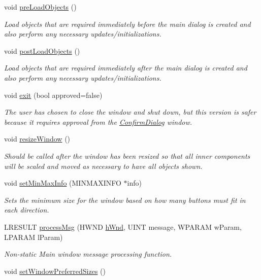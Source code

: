 \begin{DoxyCompactItemize}
void \hyperlink{class_three_d_viewer_a15047086e77ebf717c3dae973ae88d53}{preLoadObjects} ()
\begin{DoxyCompactList}\small\item\em Load objects that are required immediately before the main dialog is created and also perform any necessary updates/initializations. \end{DoxyCompactList}\item 
void \hyperlink{class_three_d_viewer_a6c8ae9a10fc6d77c57a538aad76dfdef}{postLoadObjects} ()
\begin{DoxyCompactList}\small\item\em Load objects that are required immediately after the main dialog is created and also perform any necessary updates/initializations. \end{DoxyCompactList}\item 
void \hyperlink{class_three_d_viewer_a76cec54e4663833685e82faab564b2f5}{exit} (bool approved=false)
\begin{DoxyCompactList}\small\item\em The user has chosen to close the window and shut down, but this version is safer because it requires approval from the \hyperlink{class_confirm_dialog}{ConfirmDialog} window. \end{DoxyCompactList}\item 
void \hyperlink{class_three_d_viewer_a337e1531989b355746c1665b0322178c}{resizeWindow} ()
\begin{DoxyCompactList}\small\item\em Should be called after the window has been resized so that all inner components will be scaled and moved as necessary to have all objects shown. \end{DoxyCompactList}\item 
void \hyperlink{class_three_d_viewer_a6dd0ca9b3794ad6d269745281cef10b8}{setMinMaxInfo} (MINMAXINFO $\ast$info)
\begin{DoxyCompactList}\small\item\em Sets the minimum size for the window based on how many buttons must fit in each direction. \end{DoxyCompactList}\item 
LRESULT \hyperlink{class_three_d_viewer_ae9b4f76bd749a9db09f59ffb5944bae5}{processMsg} (HWND \hyperlink{class_three_d_viewer_ae7122f9f106f58afc902c77c89cf97c4}{hWnd}, UINT message, WPARAM wParam, LPARAM lParam)
\begin{DoxyCompactList}\small\item\em Non-\/static Main window message processing function. \end{DoxyCompactList}\item 
\hypertarget{class_three_d_viewer_a98d27353905010e6e4011b33353761ea}{
void \hyperlink{class_three_d_viewer_a98d27353905010e6e4011b33353761ea}{setWindowPreferredSizes} ()}
\label{class_three_d_viewer_a98d27353905010e6e4011b33353761ea}


\end{DoxyCompactItemize}
